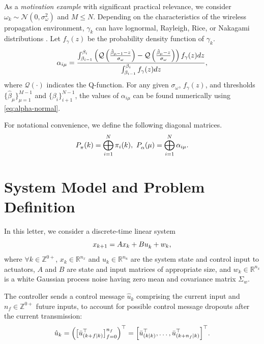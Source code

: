 \documentclass[letterpaper, 10 pt, conference]{ieeeconf}  %
\begin{document}
As a \emph{motivation example} with significant practical relevance, we consider $\omega_k \sim \mathcal{N}(0,\sigma_{\omega}^2)$ and $M\leq N$. 
Depending on the characteristics of the wireless propagation environment, $\gamma_k$ can have lognormal, Rayleigh, Rice, or Nakagami distributions \cite{stuber2017principles}. 
Let $f_{\gamma}(z)$ be the probability density function of $\gamma_k$.
\begin{equation}\label{eq:alpha-normal}
    \text{\small $\alpha_{i\mu} = \frac{
    \int_{\beta_{i-1}}^{\beta_{i}}\left(
    \mathcal{Q}\left(\frac{\hat{\beta}_{\mu-1}-z}{\sigma_{\omega}}\right) - 
    \mathcal{Q}\left(\frac{\hat{\beta}_{\mu}-z}{\sigma_{\omega}}\right) 
    \right) f_{\gamma}(z)dz}{
    \int_{\beta_{i-1}}^{\beta_{i}} f_{\gamma}(z)dz}$},
\end{equation}
where $\mathcal{Q}(\cdot)$ indicates the Q-function. For any given $\sigma_{\omega}$, $f_{\gamma}(z)$, and %
thresholds $\{\hat{\beta}_{\mu}\}_{\mu=1}^{M-1}$ and $\{\beta_{i}\}_{i+1}^{N-1}$, the values of $\alpha_{i\mu}$ can be found numerically using \eqref{eq:alpha-normal}.

For notational convenience, we define the following diagonal matrices.
\begin{equation}\label{eq:diag-prob}
     \text{\small $P_{\pi}^{}(k) = \bigoplus_{i=1}^{N} \pi_{i}(k),~P_{\alpha}^{}(\mu) = \bigoplus_{i=1}^{N} \alpha_{i\mu}$}.
\end{equation}

\section{System Model and Problem Definition}\label{sec:model}
In this letter, we consider a discrete-time linear system %
\begin{equation}\label{eq:state}
        \text{\small $x_{k+1} = A x_{k} + B u_{k}^{} + w_{k}$},
\end{equation}
where $\forall k \!\in\! \mathbb{Z}^{0+}$, $x_k\!\in\!\mathbb{R}^{n_x}$ and $u_k^{}\!\in\!\mathbb{R}^{n_u}$ are the system state and control input to actuators, $A$ and $B$ are state and input matrices of appropriate size, and $w_k\!\in\!\mathbb{R}^{n_x}$ is a white Gaussian process noise having zero mean and covariance matrix $\Sigma_w$.

The controller sends a control message $\hat{u}_k$ comprising the current input and $n_{f}\in\mathbb{Z}^{0+}$ future inputs, to account for possible control message dropouts after the current transmission: 
\begin{equation}\label{eq:control-message}
    \text{\small $\hat{u}_k =
    \left(\big[\bar{u}_{(k+f\mid k)}^{\top}\big]_{f=0}^{n_f}\right)^{\top} = 
    \left[\bar{u}_{(k\mid k)}^{\top},\dots,\bar{u}_{(k+n_f\mid k)}^{\top}\right]^{\top}$}.
\end{equation}
\end{document}
